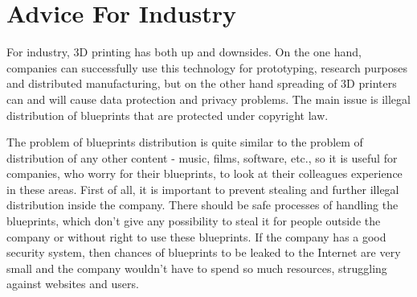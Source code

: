 \section{Advice For Industry}
For industry, 3D printing has both up and downsides. On the one hand, companies can successfully use this technology for prototyping, research purposes and distributed manufacturing, but on the other hand spreading of 3D printers can and will cause data protection and privacy problems. The main issue is illegal distribution of blueprints that are protected under copyright law.

The problem of blueprints distribution is quite similar to the problem of distribution of any other content - music, films, software, etc., so it is useful for companies, who worry for their blueprints, to look at their colleagues experience in these areas.
First of all, it is important to prevent stealing and further illegal distribution inside the company. There should be safe processes of handling the blueprints, which don’t give any possibility to steal it for people outside the company or without right to use these blueprints. If the company has a good security system, then chances of blueprints to be leaked to the Internet are very small and the company wouldn’t have to spend so much resources, struggling against websites and users.

